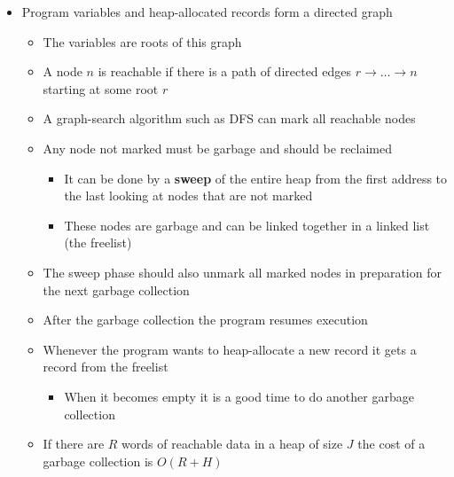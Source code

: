\documentclass[11pt]{article}
\begin{document}
\begin{itemize}
\item Program variables and heap-allocated records form a directed graph 
\begin{itemize}
\item The variables are roots of this graph
\item A node \(n\) is reachable if there is a path of directed edges \(r \to \dots \to n\) starting at some root \(r\)
\item A graph-search algorithm such as DFS can mark all reachable nodes
\item Any node not marked must be garbage and should be reclaimed
\begin{itemize}
\item It can be done by a \textbf{sweep} of the entire heap from the first address to the last looking at nodes that are not marked
\item These nodes are garbage and can be linked together in a linked list (the freelist)
\end{itemize}
\item The sweep phase should also unmark all marked nodes in preparation for the next garbage collection
\item After the garbage collection the program resumes execution
\item Whenever the program wants to heap-allocate a new record it gets a record from the freelist
\begin{itemize}
\item When it becomes empty it is a good time to do another garbage collection
\end{itemize}
\item If there are \(R\) words of reachable data in a heap of size \(J\) the cost of a garbage collection is \(O(R+H)\)
\end{itemize}
\end{itemize}
\end{document}
